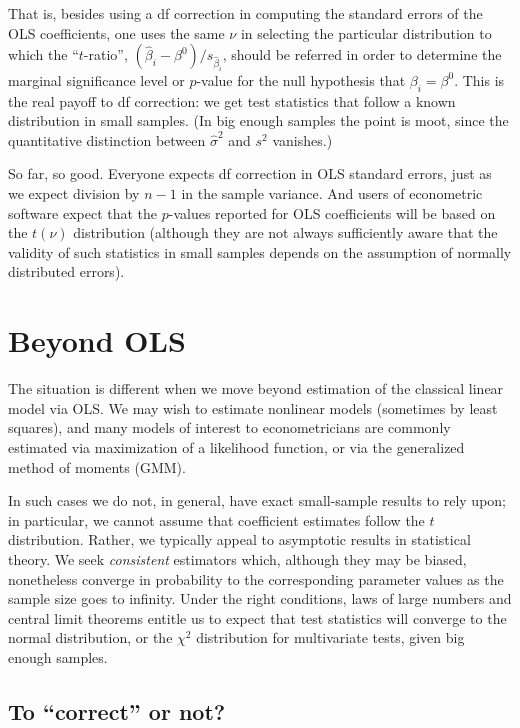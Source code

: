 That is, besides using a df correction in computing the standard
errors of the OLS coefficients, one uses the same $\nu$ in selecting
the particular distribution to which the ``$t$-ratio'',
$(\hat{\beta}_i-\beta^0)/s_{\hat{\beta}_i}$, should be referred in
order to determine the marginal significance level or $p$-value for
the null hypothesis that $\beta_i = \beta^0$.  This is the real
payoff to df correction: we get test statistics that follow a 
known distribution in small samples.  (In big enough samples
the point is moot, since the quantitative distinction between
$\hat\sigma^2$ and $s^2$ vanishes.)

So far, so good.  Everyone expects df correction in OLS standard
errors, just as we expect division by $n-1$ in the sample variance.
And users of econometric software expect that the $p$-values reported
for OLS coefficients will be based on the $t(\nu)$ distribution
(although they are not always sufficiently aware that the validity
of such statistics in small samples depends on the assumption
of normally distributed errors).

\section{Beyond OLS}
\label{sec:df-beyond}

The situation is different when we move beyond estimation of the
classical linear model via OLS.  We may wish to estimate nonlinear
models (sometimes by least squares), and many models of interest to
econometricians are commonly estimated via maximization of a
likelihood function, or via the generalized method of moments (GMM).

In such cases we do not, in general, have exact small-sample results
to rely upon; in particular, we cannot assume that coefficient
estimates follow the $t$ distribution.  Rather, we typically appeal to
asymptotic results in statistical theory.  We seek \textit{consistent}
estimators which, although they may be biased, nonetheless converge in
probability to the corresponding parameter values as the sample size
goes to infinity.  Under the right conditions, laws of large numbers
and central limit theorems entitle us to expect that test statistics
will converge to the normal distribution, or the $\chi^2$ distribution
for multivariate tests, given big enough samples.

\subsection{To ``correct'' or not?}

